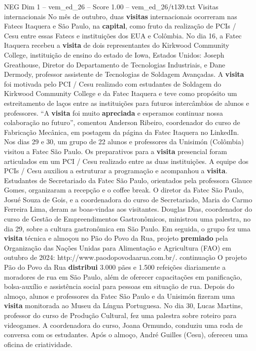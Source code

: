 \begin{textsample}{NEG Dim 1 – vem\_ed\_26 – Score 1.00 – vem\_ed\_26/t139.txt}  \label{ex:f1_neg_127}
Visitas internacionais No mês de outubro, duas \textbf{visitas} internacionais ocorreram nas Fatecs Itaquera e São Paulo, na \textbf{capital}, como fruto da realização de PCIs / Cesu entre essas Fatecs e instituições dos EUA e Colômbia.
No dia 16, a Fatec Itaquera recebeu a \textbf{visita} de dois representantes do Kirkwood Community College, instituição de ensino do estado de Iowa, Estados Unidos: Joseph Greathouse, Diretor do Departamento de Tecnologias Industriais, e Dane Dermody, professor assistente de Tecnologias de Soldagem Avançadas.
A \textbf{visita} foi motivada pelo PCI / Cesu realizado com estudantes de Soldagem do Kirkwood Community College e da Fatec Itaquera e teve como propósito um estreitamento de laços entre as instituições para futuros intercâmbios de alunos e professores. “A \textbf{visita} foi muito \textbf{apreciada} e esperamos continuar nossa colaboração no futuro”, comentou Anderson Ribeiro, coordenador do curso de Fabricação Mecânica, em postagem da página da Fatec Itaquera no LinkedIn.
Nos dias 29 e 30, um grupo de 22 alunos e professores da Unisimón (Colômbia) visitou a Fatec São Paulo.
Os preparativos para a \textbf{visita} presencial foram articulados em um PCI / Cesu realizado entre as duas instituições.
A equipe dos PCIs / Cesu auxiliou a estruturar a programação e acompanhou a \textbf{visita}.
Estudantes de Secretariado da Fatec São Paulo, orientados pela professora Glauce Gomes, organizaram a recepção e o coffee break.
O diretor da Fatec São Paulo, Josué Souza de Gois, e a coordenadora do curso de Secretariado, Maria do Carmo Ferreira Lima, deram as boas-vindas aos visitantes.
Douglas Dias, coordenador do curso de Gestão de Empreendimentos Gastronômicos, ministrou uma palestra, no dia 29, sobre a cultura gastronômica em São Paulo.
Em seguida, o grupo fez uma \textbf{visita} técnica e almoçou no Pão do Povo da Rua, projeto \textbf{premiado} pela Organização das Nações Unidas para Alimentação e Agricultura (FAO) em outubro de 2024: http://www.paodopovodaarua.com.br/. continuação O projeto Pão do Povo da Rua \textbf{distribui} 3.000 pães e 1.500 refeições diariamente a moradores de rua em São Paulo, além de oferecer capacitações em panificação, bolsa-auxílio e assistência social para pessoas em situação de rua.
Depois do almoço, alunos e professores da Fatec São Paulo e da Unisimón fizeram uma \textbf{visita} monitorada ao Museu da Língua Portuguesa.
No dia 30, Lucas Martins, professor do curso de Produção Cultural, fez uma palestra sobre roteiro para videogames.
A coordenadora do curso, Joana Ormundo, conduziu uma roda de conversa com os estudantes.
Após o almoço, André Guilles (Cesu), ofereceu uma oficina de criatividade.

\end{textsample}

